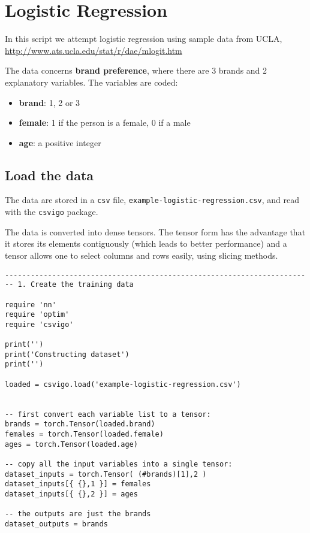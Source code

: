 \section{Logistic Regression}
\label{app:logistic_regression}

In this script we attempt logistic regression using sample data from UCLA,
\url{http://www.ats.ucla.edu/stat/r/dae/mlogit.htm}

The data concerns {\bf brand preference}, where there are 3 brands and 2
explanatory variables. The variables are coded:

\begin{itemize}
   \item {\bf brand}: 1, 2 or 3
   \item {\bf female}: 1 if the person is a female, 0 if a male
   \item {\bf age}: a positive integer
 \end{itemize}
 
 \subsection*{Load the data}

The data are stored in a {\tt csv} file, {\tt example-logistic-regression.csv},
and read with the {\tt csvigo} package. 

The data is converted into dense tensors. The tensor form has the
advantage that it stores its elements contiguously (which leads to
better performance) and a tensor allows one to select columns and rows
easily, using slicing methods.


\begin{verbatim}
----------------------------------------------------------------------
-- 1. Create the training data

require 'nn'
require 'optim'
require 'csvigo'

print('')
print('Constructing dataset')
print('')

loaded = csvigo.load('example-logistic-regression.csv')


-- first convert each variable list to a tensor:
brands = torch.Tensor(loaded.brand)
females = torch.Tensor(loaded.female)
ages = torch.Tensor(loaded.age)

-- copy all the input variables into a single tensor:
dataset_inputs = torch.Tensor( (#brands)[1],2 )
dataset_inputs[{ {},1 }] = females
dataset_inputs[{ {},2 }] = ages

-- the outputs are just the brands
dataset_outputs = brands

\end{verbatim}

